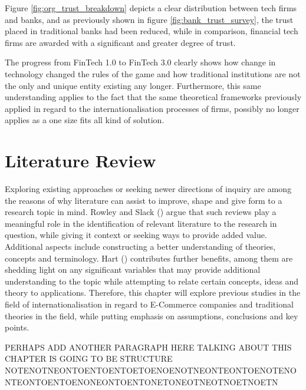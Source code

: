 \documentclass[11pt,a4paper]{article}
\begin{document}
Figure \ref{fig:org_trust_breakdown} depicts a clear distribution between tech firms and banks, and as previously shown in figure \ref{fig:bank_trust_survey}, the trust placed in traditional banks had been reduced, while in comparison, financial tech firms are awarded with a significant and greater degree of trust. \par
The progress from FinTech 1.0 to FinTech 3.0 clearly shows how change in technology changed the rules of the game and how traditional institutions are not the only and unique entity existing any longer. Furthermore, this same understanding applies to the fact that the same theoretical frameworks previously applied in regard to the internationalisation processes of firms, possibly no longer applies as a one size fits all kind of solution. 







\section{Literature Review}
\label{lit_review}
  \vspace{-5mm}
Exploring existing approaches or seeking newer directions of inquiry are among the reasons of why  literature can assist to improve, shape and give form to a research topic in mind. Rowley and Slack (\citeyear{rowleyConductingLiteratureReview2004}) argue that such reviews play a meaningful role in the identification of relevant literature to the research in question, while giving it context or seeking ways to provide added value. Additional aspects include constructing a better understanding of theories, concepts and terminology. Hart (\citeyear{hartDoingLiteratureReview1998}) contributes further benefits, among them are shedding light on any significant variables that may provide additional understanding to the topic while attempting to relate certain concepts, ideas and theory to applications. Therefore, this chapter will explore previous studies in the field of internationalisation in regard to E-Commerce companies and traditional theories  in the field, while putting emphasis on assumptions, conclusions and key points. \par
PERHAPS ADD ANOTHER PARAGRAPH HERE TALKING ABOUT THIS CHAPTER IS GOING TO BE STRUCTURE NOTENOTNEONTOENTOENTOETOENOENOTNEONTEONTOENOTENONTEONTOENTOENONEONTOENTONETONEOTNEOTNOETNOETN
\end{document}

